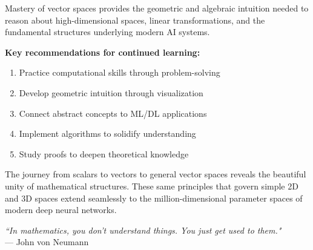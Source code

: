 \documentclass[12pt,a4paper]{article}
\theoremstyle{definition}
\begin{document}
Mastery of vector spaces provides the geometric and algebraic intuition needed to reason about high-dimensional spaces, linear transformations, and the fundamental structures underlying modern AI systems.

\textbf{Key recommendations for continued learning:}
\begin{enumerate}
    \item Practice computational skills through problem-solving
    \item Develop geometric intuition through visualization
    \item Connect abstract concepts to ML/DL applications
    \item Implement algorithms to solidify understanding
    \item Study proofs to deepen theoretical knowledge
\end{enumerate}

The journey from scalars to vectors to general vector spaces reveals the beautiful unity of mathematical structures. These same principles that govern simple 2D and 3D spaces extend seamlessly to the million-dimensional parameter spaces of modern deep neural networks.

\vfill
\begin{center}
\textit{``In mathematics, you don't understand things. You just get used to them."} \\
— John von Neumann
\end{center}
\end{document}
